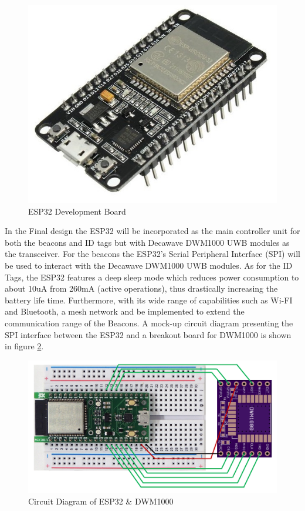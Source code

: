 \begin{figure}[H]
\centering
    \includegraphics[scale=0.25]{./images/esp.jpg}
    \caption{ESP32 Development Board}
    \label{esp}
\end{figure}


\pagebreak
In the Final design the ESP32 will be incorporated as the main controller unit for both the beacons and ID tags but with Decawave DWM1000 UWB modules as the transceiver. For the beacons the ESP32’s Serial Peripheral Interface (SPI) will be used to interact with the Decawave DWM1000 UWB modules. As for the ID Tags, the ESP32 features a deep sleep mode which reduces power consumption to about 10uA from 260mA (active operations), thus drastically increasing the battery life time. Furthermore, with its wide range of capabilities such as Wi-FI and Bluetooth, a mesh network and be implemented to extend the communication range of the Beacons. A mock-up circuit diagram presenting the SPI interface between the ESP32 and a breakout board for DWM1000 is shown in figure \ref{eps_dwm_circuit}.

\medskip
\begin{figure}[H]
\centering
    \includegraphics[scale=0.5]{./images/eps_dwm_circuit.png}
    \caption{Circuit Diagram of ESP32 \& DWM1000}
    \label{eps_dwm_circuit}
\end{figure}



